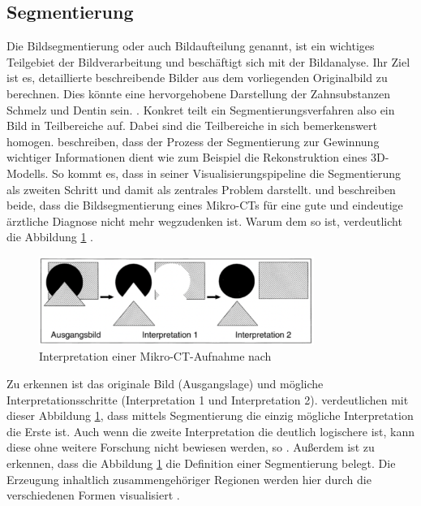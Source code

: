 \pagebreak

\subsection{Segmentierung}
\label{subsec:segmentierung} Die Bildsegmentierung oder auch Bildaufteilung
genannt, ist ein wichtiges Teilgebiet der Bildverarbeitung und beschäftigt sich mit
der Bildanalyse. Ihr Ziel ist es, detaillierte beschreibende Bilder aus dem vorliegenden
Originalbild zu berechnen. Dies könnte eine hervorgehobene Darstellung der
Zahnsubstanzen Schmelz und Dentin sein. \citep[vgl.][S.~359]{lehmann2013bildverarbeitung}.
Konkret teilt ein Segmentierungsverfahren also ein Bild in Teilbereiche auf.
Dabei sind die Teilbereiche in sich bemerkenswert homogen. \citet[S.~1]{ramesh2021}
beschreiben, dass der Prozess der Segmentierung zur Gewinnung wichtiger Informationen
dient wie zum Beispiel die Rekonstruktion eines \ac{3D}-Modells. So kommt es,
dass \citet[S.~50]{handels2000} in seiner Visualisierungspipeline die Segmentierung
als zweiten Schritt und damit als zentrales Problem darstellt. \citet[S.~95]{handels2000}
und \citet[S.~360]{lehmann2013bildverarbeitung} beschreiben beide, dass die Bildsegmentierung
eines Mikro-\ac{CT}s für eine gute und eindeutige ärztliche Diagnose nicht mehr wegzudenken
ist. Warum dem so ist, verdeutlicht die Abbildung \ref{fig:interpretation_einer_ct_aufnahem}
\citep[vgl.][S.~360]{lehmann2013bildverarbeitung}.

\begin{figure}[h]
	\centering
	\includegraphics[width=0.8\textwidth]{img/bild_interpretation.jpg}
	\caption{Interpretation einer Mikro-CT-Aufnahme nach \citet[S.~360]{lehmann2013bildverarbeitung}}
	\label{fig:interpretation_einer_ct_aufnahem}
\end{figure}

Zu erkennen ist das originale Bild (Ausgangslage) und mögliche Interpretationsschritte
(Interpretation 1 und Interpretation 2). \citet[S.~360]{lehmann2013bildverarbeitung}
verdeutlichen mit dieser Abbildung \ref{fig:interpretation_einer_ct_aufnahem},
dass mittels Segmentierung die einzig mögliche Interpretation die Erste ist. Auch
wenn die zweite Interpretation die deutlich logischere ist, kann diese ohne
weitere Forschung nicht bewiesen werden, so \citet[S.~360]{lehmann2013bildverarbeitung}.
Außerdem ist zu erkennen, dass die Abbildung
\ref{fig:interpretation_einer_ct_aufnahem} die Definition einer Segmentierung
belegt. Die Erzeugung inhaltlich zusammengehöriger Regionen werden hier durch die
verschiedenen Formen visualisiert \citep[vgl.][S.~360]{lehmann2013bildverarbeitung}.

